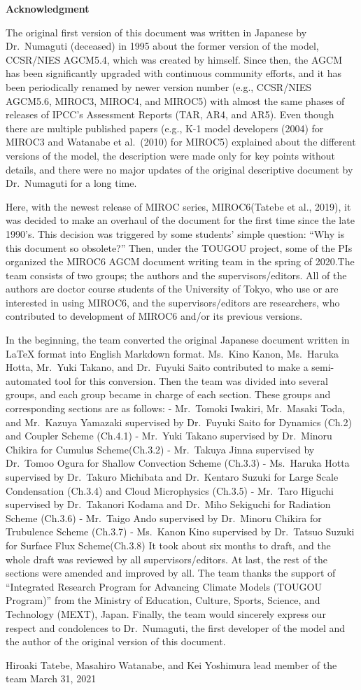 \textbf{Acknowledgment}

The original first version of this document was written in Japanese by
Dr.~Numaguti (deceased) in 1995 about the former version of the model,
CCSR/NIES AGCM5.4, which was created by himself. Since then, the AGCM has
been significantly upgraded with continuous community efforts, and it has
been periodically renamed by newer version number (e.g., CCSR/NIES
AGCM5.6, MIROC3, MIROC4, and MIROC5) with almost the same phases
of releases of IPCC's Assessment Reports (TAR, AR4, and AR5). Even though
there are multiple published papers (e.g., K-1 model developers (2004)
for MIROC3 and Watanabe et al.~(2010) for MIROC5) explained about the
different versions of the model, the description were made only for key
points without details, and there were no major updates of the original
descriptive document by Dr.~Numaguti for a long time.

Here, with the newest release of MIROC series, MIROC6(Tatebe et al.,
2019), it was decided to make an overhaul of the document for the first
time since the late 1990's.  This decision was triggered by some students'
simple question: ``Why is this document so obsolete?''
Then, under the
TOUGOU project, some of the PIs organized the MIROC6 AGCM document
writing team in the spring of 2020.The team consists of two groups; the
authors and the supervisors/editors. All of the authors are doctor course
students of the University of Tokyo, who use or are interested in using
MIROC6, and the supervisors/editors are researchers, who contributed
to development of MIROC6 and/or its previous versions.

In the beginning, the team converted the original Japanese document
written in \LaTeX{} format into English Markdown format. Ms.~Kino Kanon,
Ms.~Haruka Hotta, Mr.~Yuki Takano, and Dr.~Fuyuki Saito contributed to
make a semi-automated tool for this conversion. Then the team was
divided into several groups, and each group became in charge of
each section. These groups and corresponding sections are as follows: -
Mr.~Tomoki Iwakiri, Mr.~Masaki Toda, and Mr.~Kazuya Yamazaki supervised
by Dr.~Fuyuki Saito for Dynamics (Ch.2) and Coupler Scheme (Ch.4.1) -
Mr.~Yuki Takano supervised by Dr.~Minoru Chikira for Cumulus
Scheme(Ch.3.2) - Mr.~Takuya Jinna supervised by Dr.~Tomoo Ogura for
Shallow Convection Scheme (Ch.3.3) - Ms.~Haruka Hotta supervised by
Dr.~Takuro Michibata and Dr.~Kentaro Suzuki for Large Scale Condensation
(Ch.3.4) and Cloud Microphysics (Ch.3.5) - Mr.~Taro Higuchi supervised
by Dr.~Takanori Kodama and Dr.~Miho Sekiguchi for Radiation Scheme
(Ch.3.6) - Mr.~Taigo Ando supervised by Dr.~Minoru Chikira for
Trubulence Scheme (Ch.3.7) - Ms.~Kanon Kino supervised by Dr.~Tatsuo
Suzuki for Surface Flux Scheme(Ch.3.8) It took about six months to
draft, and the whole draft was reviewed by all supervisors/editors. At
last, the rest of the sections were amended and improved by all. The
team thanks the support of ``Integrated Research Program for Advancing
Climate Models (TOUGOU Program)'' from the Ministry of Education,
Culture, Sports, Science, and Technology (MEXT), Japan.  Finally, the team
would sincerely express our respect and condolences to Dr.~Numaguti, the
first developer of the model and the author of the original version of
this document.

Hiroaki Tatebe, Masahiro Watanabe, and Kei Yoshimura lead member of the
team March 31, 2021

